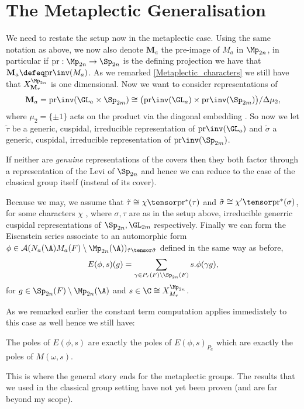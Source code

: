     \section{The Metaplectic Generalisation}
    We need to restate the setup now in the metaplectic case. Using the same notation as above, we now also denote \(\mathbf{M}_a\) the pre-image of \(M_a\) in \(\Mp_{2n}\), in particular if \(\mathrm{pr}: \Mp_{2n} \to \Sp_{2n}\) is the defining projection we have that \(\mathbf{M}_a \defeq \mathrm{pr}\inv(M_a)\). As we remarked \ref{Metaplectic_characters} we still have that \(X_{\mathbf{M}_r}^{\Mp_{2n}}\) is one dimensional. Now we want to consider representations of 
    \[\mathbf{M}_a = \mathrm{pr}\inv(\GL_a \times \Sp_{2m}) \cong \big(\mathrm{pr}\inv(\GL_a)\times \mathrm{pr}\inv(\Sp_{2m})\big)/\Delta \mu_2,\]
    where \(\mu_2 = \{\pm 1\}\) acts on the product via the diagonal embedding .
    So now we let \(\tilde{\tau}\) be a generic, cuspidal, irreducible representation of \(\mathrm{pr}\inv(\GL_a)\) and \(\tilde{\sigma}\) a generic, cuspidal, irreducible representation of \(\mathrm{pr}\inv(\Sp_{2m})\). 

    \begin{remark}
        If neither are \textit{genuine} representations of the covers then they both factor through a representation of the Levi of \(\Sp_{2n}\) and hence we can reduce to the case of the classical group itself (instead of its cover).
    \end{remark}

    Because we may,  we assume that \(\tilde{\tau} \cong \chi\tensor \mathrm{pr}^*(\tau)\) and \(\tilde{\sigma} \cong \chi'\tensor \mathrm{pr}^*(\sigma)\), for some characters \(\chi\) , where \(\sigma, \tau\) are as in the setup above, irreducible generric cuspidal representations of \(\Sp_{2n}, \GL_{2m}\) respectively.
    Finally we can form the Eisenstein series associate to an automorphic form \(\phi\in \mathcal{A}(N_a(\A)M_a(F)\setminus \Mp_{2n}(\A) )_{\tilde{\tau}\tensor \tilde\sigma}\) defined in the same way as before,
    \[E(\phi, s)(g) = \sum_{\gamma\in P_r(F) \setminus \Sp_{2n}(F)} s.\phi(\gamma g),\]
    for \(g\in \Sp_{2n}(F) \setminus \Mp_{2n}(\A)\) and \(s\in \C \cong X^{\Mp_{2n}}_{M_r}\).

    As we remarked earlier the constant term computation applies immediately to this case as well hence we still have:
    \begin{Lemma}
            The poles of \(E(\phi, s)\) are exactly the poles of \(E(\phi,s)_{P_a}\) which are exactly the poles of \(M(\omega, s)\).
    \end{Lemma}
    This is where the general story ends for the metaplectic groups. The results that we used in the classical group setting have not yet been proven (and are far beyond my scope). 

